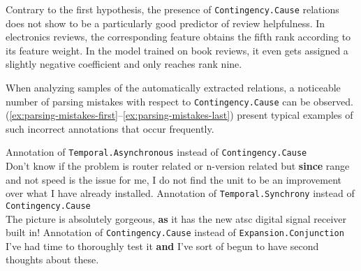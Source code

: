 \documentclass[
    a4paper,%
    12pt,%
    oneside,%
    toc=bibliography,
    final,
]{scrartcl}
\begin{document}
\begin{table}[h!]
	\centering
	
	\caption{Comparison of selected linguistic features between reviews including and reviews without \lstinline|Expansion.Conjunction| relations in book reviews}
	\label{tab:conjunction-features-books}
	
	\begin{threeparttable}
	\renewcommand{\arraystretch}{1.5}
	
	\end{threeparttable}

\end{table}

Contrary to the first hypothesis, the presence of \lstinline|Contingency.Cause| relations does not show to be a particularly good predictor of review helpfulness. In electronics reviews, the corresponding feature obtains the fifth rank according to its feature weight. In the model trained on book reviews, it even gets assigned a slightly negative coefficient and only reaches rank nine.

When analyzing samples of the automatically extracted relations, a noticeable number of parsing mistakes with respect to \lstinline|Contingency.Cause| can be observed. (\ref{ex:parsing-mistakes-first}–\ref{ex:parsing-mistakes-last}) present typical examples of such incorrect annotations that occur frequently.

\begin{exe}
\ex \label{ex:parsing-mistakes-first} Annotation of \lstinline|Temporal.Asynchronous| instead of \lstinline|Contingency.Cause|\\
Don't know if the problem is router related or n-version related but \textbf{since} range and not speed is the issue for me, I do not find the unit to be an improvement over what I have already installed.
\ex Annotation of \lstinline|Temporal.Synchrony| instead of \lstinline|Contingency.Cause|\\
The picture is absolutely gorgeous, \textbf{as} it has the new atsc digital signal receiver built in!
\ex \label{ex:parsing-mistakes-last} Annotation of \lstinline|Contingency.Cause| instead of \lstinline|Expansion.Conjunction|\\
I've had time to thoroughly test it \textbf{and} I've sort of begun to have second thoughts about these.
\end{exe}
\end{document}
